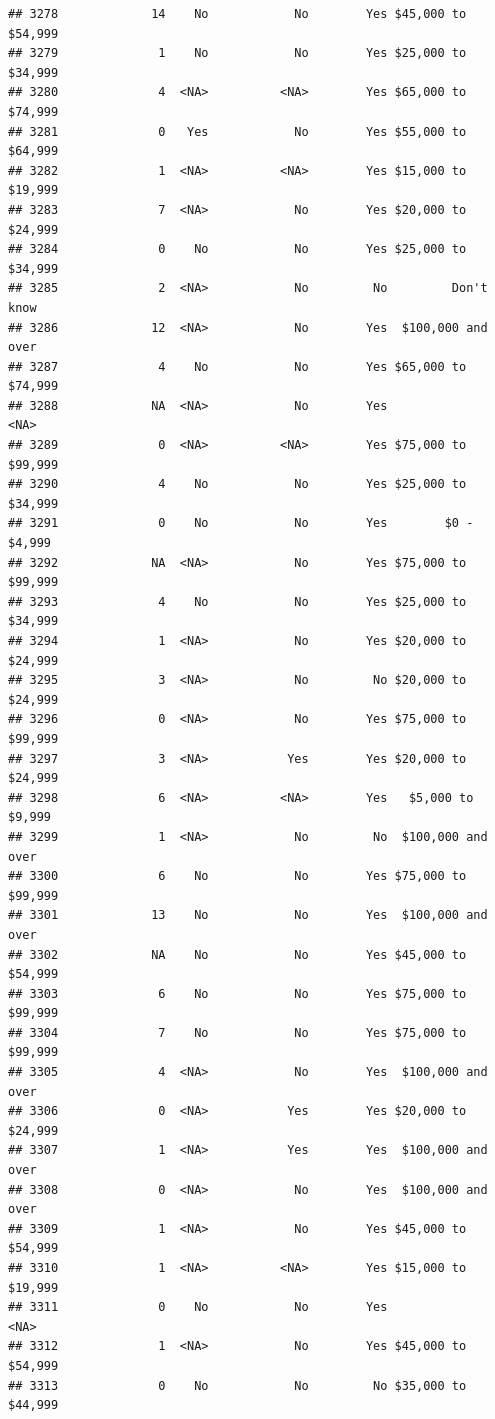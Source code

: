 \documentclass[man]{apa6}
\begin{document}
\begin{verbatim}
## 3278             14    No            No        Yes $45,000 to $54,999
## 3279              1    No            No        Yes $25,000 to $34,999
## 3280              4  <NA>          <NA>        Yes $65,000 to $74,999
## 3281              0   Yes            No        Yes $55,000 to $64,999
## 3282              1  <NA>          <NA>        Yes $15,000 to $19,999
## 3283              7  <NA>            No        Yes $20,000 to $24,999
## 3284              0    No            No        Yes $25,000 to $34,999
## 3285              2  <NA>            No         No         Don't know
## 3286             12  <NA>            No        Yes  $100,000 and over
## 3287              4    No            No        Yes $65,000 to $74,999
## 3288             NA  <NA>            No        Yes               <NA>
## 3289              0  <NA>          <NA>        Yes $75,000 to $99,999
## 3290              4    No            No        Yes $25,000 to $34,999
## 3291              0    No            No        Yes        $0 - $4,999
## 3292             NA  <NA>            No        Yes $75,000 to $99,999
## 3293              4    No            No        Yes $25,000 to $34,999
## 3294              1  <NA>            No        Yes $20,000 to $24,999
## 3295              3  <NA>            No         No $20,000 to $24,999
## 3296              0  <NA>            No        Yes $75,000 to $99,999
## 3297              3  <NA>           Yes        Yes $20,000 to $24,999
## 3298              6  <NA>          <NA>        Yes   $5,000 to $9,999
## 3299              1  <NA>            No         No  $100,000 and over
## 3300              6    No            No        Yes $75,000 to $99,999
## 3301             13    No            No        Yes  $100,000 and over
## 3302             NA    No            No        Yes $45,000 to $54,999
## 3303              6    No            No        Yes $75,000 to $99,999
## 3304              7    No            No        Yes $75,000 to $99,999
## 3305              4  <NA>            No        Yes  $100,000 and over
## 3306              0  <NA>           Yes        Yes $20,000 to $24,999
## 3307              1  <NA>           Yes        Yes  $100,000 and over
## 3308              0  <NA>            No        Yes  $100,000 and over
## 3309              1  <NA>            No        Yes $45,000 to $54,999
## 3310              1  <NA>          <NA>        Yes $15,000 to $19,999
## 3311              0    No            No        Yes               <NA>
## 3312              1  <NA>            No        Yes $45,000 to $54,999
## 3313              0    No            No         No $35,000 to $44,999

\end{verbatim}
\end{document}
